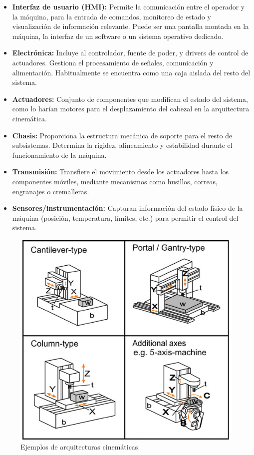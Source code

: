 \begin{itemize}
    \item \textbf{Interfaz de usuario (HMI):} Permite la comunicación entre el operador y la máquina, para la entrada de comandos, monitoreo de estado y visualización de información relevante. Puede ser una pantalla montada en la máquina, la interfaz de un software o un sistema operativo dedicado.

    \item \textbf{Electrónica:} Incluye al controlador, fuente de poder, y drivers de control de actuadores. Gestiona el procesamiento de señales, comunicación y alimentación. Habitualmente se encuentra como una caja aislada del resto del sistema.

    \item \textbf{Actuadores:} Conjunto de componentes que modifican el estado del sistema, como lo harían motores para el desplazamiento del cabezal en la arquitectura cinemática.

    \item \textbf{Chasis:} Proporciona la estructura mecánica de soporte para el resto de subsistemas. Determina la rigidez, alineamiento y estabilidad durante el funcionamiento de la máquina.

    \item \textbf{Transmisión:} Transfiere el movimiento desde los actuadores hasta los componentes móviles, mediante mecanismos como husillos, correas, engranajes o cremalleras.

    \item \textbf{Sensores/instrumentación:} Capturan información del estado físico de la máquina (posición, temperatura, límites, etc.) para permitir el control del sistema.
\end{itemize}

\begin{figure}[h!]
    \centering
    \includegraphics[width=0.60\linewidth]{imgs/kins.png}
    \caption{Ejemplos de arquitecturas cinemáticas. \cite{kinematic}}
    \label{kinsfig}
\end{figure}

